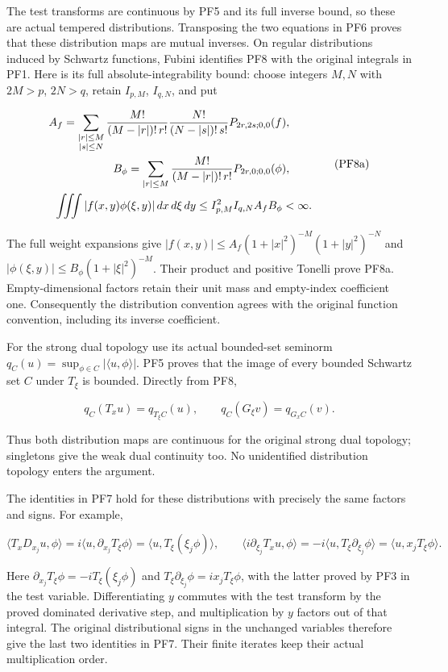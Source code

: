 \documentclass[
  11pt,
]{article}
\begin{document}
The test transforms are continuous by PF5 and its full inverse bound, so
these are actual tempered distributions. Transposing the two equations
in PF6 proves that these distribution maps are mutual inverses. On
regular distributions induced by Schwartz functions, Fubini identifies
PF8 with the original integrals in PF1. Here is its full
absolute-integrability bound: choose integers \(M,N\) with \(2M>p\),
\(2N>q\), retain \(I_{p,M}\), \(I_{q,N}\), and put

\[
\begin{aligned}
 A_f=\sum_{\substack{|r|\leq M\\|s|\leq N}}
       {M!\over(M-|r|)!\,r!}{N!\over(N-|s|)!\,s!}
       P_{2r,2s;0,0}(f),\qquad\\
 B_\phi=\sum_{|r|\leq M}{M!\over(M-|r|)!\,r!}
       P_{2r,0;0,0}(\phi),
 \qquad\\
 \iiint |f(x,y)\phi(\xi,y)|\,dx\,d\xi\,dy
       \leq I_{p,M}^2 I_{q,N} A_f B_\phi<\infty.
 \end{aligned}
\tag{PF8a}
\]

The full weight expansions give
\(|f(x,y)|\leq A_f(1+|x|^2)^{-M}(1+|y|^2)^{-N}\) and
\(|\phi(\xi,y)|\leq B_\phi(1+|\xi|^2)^{-M}\). Their product and positive
Tonelli prove PF8a. Empty-dimensional factors retain their unit mass and
empty-index coefficient one. Consequently the distribution convention
agrees with the original function convention, including its inverse
coefficient.

For the strong dual topology use its actual bounded-set seminorm
\(q_C(u)=\sup_{\phi\in C}|\langle u,\phi\rangle|\). PF5 proves that the
image of every bounded Schwartz set \(C\) under \(T_\xi\) is bounded.
Directly from PF8,

\[
 q_C(T_xu)=q_{T_\xi C}(u),\qquad
 q_C(G_\xi v)=q_{G_x C}(v).
 \tag{PF9}
\]

Thus both distribution maps are continuous for the original strong dual
topology; singletons give the weak dual continuity too. No unidentified
distribution topology enters the argument.

The identities in PF7 hold for these distributions with precisely the
same factors and signs. For example,

\[
 \langle T_xD_{x_j}u,\phi\rangle
  =i\langle u,\partial_{x_j}T_\xi\phi\rangle
  =\langle u,T_\xi(\xi_j\phi)\rangle,
 \qquad
 \langle i\partial_{\xi_j}T_xu,\phi\rangle
  =-i\langle u,T_\xi\partial_{\xi_j}\phi\rangle
  =\langle u,x_jT_\xi\phi\rangle.
 \tag{PF10}
\]

Here \(\partial_{x_j}T_\xi\phi=-iT_\xi(\xi_j\phi)\) and
\(T_\xi\partial_{\xi_j}\phi=i x_jT_\xi\phi\), with the latter proved by
PF3 in the test variable. Differentiating \(y\) commutes with the test
transform by the proved dominated derivative step, and multiplication by
\(y\) factors out of that integral. The original distributional signs in
the unchanged variables therefore give the last two identities in PF7.
Their finite iterates keep their actual multiplication order.
\end{document}
